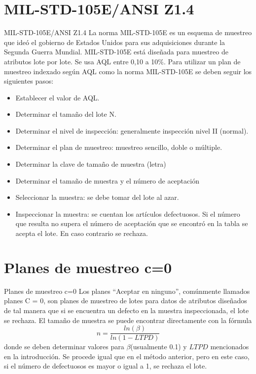 \documentclass[10pt]{beamer}
\begin{document}
\section{MIL-STD-105E/ANSI Z1.4}
\begin{frame}{MIL-STD-105E/ANSI Z1.4}
La norma MIL-STD-105E es un esquema de muestreo que ideó el gobierno de Estados Unidos para sus adquisiciones durante la Segunda Guerra Mundial. MIL-STD-105E está diseñada para muestreo de atributos lote por lote. Se usa AQL entre 0,10 a 10\%. Para utilizar un plan de muestreo indexado según AQL como la norma MIL-STD-105E se deben seguir los siguientes pasos:
\begin{itemize}
\justifying
\item[1.] Establecer el valor de AQL.
\item[2.] Determinar el tamaño del lote N.
\item[3.] Determinar el nivel de inspección: generalmente inspección nivel II (normal).
\item[4.] Determinar el plan de muestreo: muestreo sencillo, doble o múltiple.
\item[5.] Determinar la clave de tamaño de muestra (letra)
\item[6.] Determinar el tamaño de muestra y el número de aceptación
\item[7.] Seleccionar la muestra: se debe tomar del lote al azar.
\item[8.] Inspeccionar la muestra: se cuentan los artículos defectuosos. Si el número que resulta no supera el número de aceptación que se encontró en la tabla se acepta el lote. En caso contrario se rechaza.
\end{itemize}
\end{frame}

\section{Planes de muestreo c=0}
\begin{frame}{Planes de muestreo c=0}
Los planes ``Aceptar en ninguno'', comúnmente llamados planes C = 0, son planes de muestreo de lotes para datos de atributos diseñados de tal manera que si se encuentra un defecto en la muestra inspeccionada, el lote se rechaza. El tamaño de muestra se puede encontrar directamente con la fórmula
$$n=\frac{ln(\beta)}{ln(1-LTPD)}$$ 
donde se deben determinar valores para $\beta$(usualmente 0.1) y $LTPD$ mencionados en la introducción. Se procede igual que en el método anterior, pero en este caso, si el número de defectuosos es mayor o igual a 1, se rechaza el lote.
\end{frame}
\end{document}
